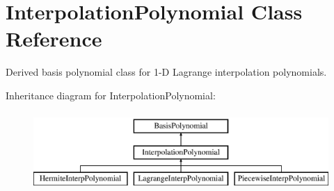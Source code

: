 \section{Interpolation\+Polynomial Class Reference}
\label{classPecos_1_1InterpolationPolynomial}


Derived basis polynomial class for 1-\/D Lagrange interpolation polynomials.  


Inheritance diagram for Interpolation\+Polynomial\+:\begin{figure}[H]
\begin{center}
\leavevmode
\includegraphics[height=3.000000cm]{classPecos_1_1InterpolationPolynomial}
\end{center}
\end{figure}
